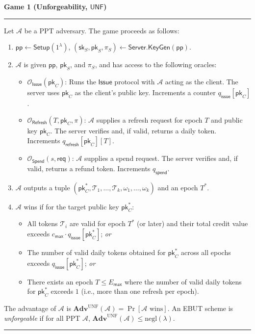 \documentclass[11pt]{article}
\theoremstyle{definitionstyle}
\theoremstyle{plain}
\newenvironment{game}[2][]
  {\par\addvspace{\topsep}\noindent\textbf{Game #2}\ #1\par\nobreak\smallskip\hrule\smallskip}
  {\hrule\par\addvspace{\topsep}}
\newcommand{\advantage}[1]{\mathbf{Adv}^{\mathrm{#1}}}
\newcommand{\negl}{\mathrm{negl}}
\begin{document}
\begin{game}{1 (Unforgeability, $\mathsf{UNF}$)}
Let $\mathcal{A}$ be a PPT adversary. The game proceeds as follows:
\begin{enumerate}[leftmargin=*]
\item $\mathsf{pp} \leftarrow \mathsf{Setup}(1^\lambda)$, $(\mathsf{sk}_S, \mathsf{pk}_S, \pi_S) \leftarrow \mathsf{Server.KeyGen}(\mathsf{pp})$.
\item $\mathcal{A}$ is given $\mathsf{pp}$, $\mathsf{pk}_S$, and $\pi_S$, and has access to the following oracles:
  \begin{itemize}
  \item $\mathcal{O}_{\mathsf{Issue}}(\mathsf{pk}_C)$: Runs the $\mathsf{Issue}$ protocol with $\mathcal{A}$ acting as the client. The server uses $\mathsf{pk}_C$ as the client's public key. Increments a counter $q_{\mathsf{issue}}[\mathsf{pk}_C]$.
  \item $\mathcal{O}_{\mathsf{Refresh}}(T, \mathsf{pk}_C, \pi)$: $\mathcal{A}$ supplies a refresh request for epoch $T$ and public key $\mathsf{pk}_C$. The server verifies and, if valid, returns a daily token. Increments $q_{\mathsf{refresh}}[\mathsf{pk}_C][T]$.
  \item $\mathcal{O}_{\mathsf{Spend}}(s, \mathsf{req})$: $\mathcal{A}$ supplies a spend request. The server verifies and, if valid, returns a refund token. Increments $q_{\mathsf{spend}}$.
  \end{itemize}
\item $\mathcal{A}$ outputs a tuple $(\mathsf{pk}_C^*, \mathcal{T}_1, \dots, \mathcal{T}_k, \omega_1, \dots, \omega_k)$ and an epoch $T^*$.
\item $\mathcal{A}$ wins if for the target public key $\mathsf{pk}_C^*$:
  \begin{itemize}
  \item All tokens $\mathcal{T}_i$ are valid for epoch $T^*$ (or later) and their total credit value exceeds $c_{\mathsf{max}} \cdot q_{\mathsf{issue}}[\mathsf{pk}_C^*]$; \emph{or}
  \item The number of valid daily tokens obtained for $\mathsf{pk}_C^*$ across all epochs exceeds $q_{\mathsf{issue}}[\mathsf{pk}_C^*]$; \emph{or}
  \item There exists an epoch $T \le E_{\mathsf{max}}$ where the number of valid daily tokens for $\mathsf{pk}_C^*$ exceeds $1$ (i.e., more than one refresh per epoch).
  \end{itemize}
\end{enumerate}
The advantage of $\mathcal{A}$ is $\advantage{UNF}(\mathcal{A}) = \Pr[\mathcal{A} \text{ wins}]$. An EBUT scheme is \emph{unforgeable} if for all PPT $\mathcal{A}$, $\advantage{UNF}(\mathcal{A}) \le \negl(\lambda)$.
\end{game}
\end{document}
